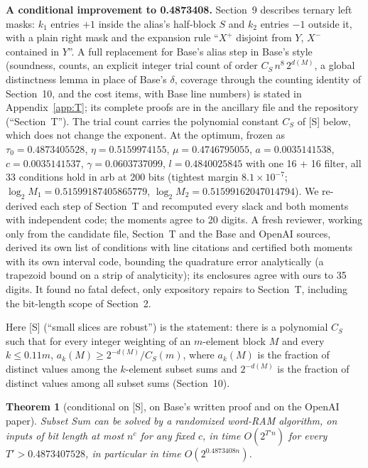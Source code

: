 \documentclass[11pt]{article}
\theoremstyle{plain}
\newtheorem{theorem}{Theorem}
\begin{document}
\textbf{A conditional improvement to 0.4873408.} Section~9 describes ternary left masks: $k_1$ entries $+1$ inside the alias's half-block $S$ and $k_2$ entries $-1$ outside it, with a plain right mask and the expansion rule ``$X^+$ disjoint from $Y$, $X^-$ contained in $Y$''. A full replacement for Base's alias step in Base's style (soundness, counts, an explicit integer trial count of order $C_S\, n^8\, 2^{d(M)}$, a global distinctness lemma in place of Base's $\delta$, coverage through the counting identity of Section~10, and the cost items, with Base line numbers) is stated in Appendix~\ref{app:T}; its complete proofs are in the ancillary file and the repository (``Section~T''). The trial count carries the polynomial constant $C_S$ of [S] below, which does not change the exponent. At the optimum, frozen as $\tau_0 = 0.4873405528$, $\eta = 0.5159974155$, $\mu = 0.4746795055$, $a = 0.0035141538$, $c = 0.0035141537$, $\gamma = 0.0603737099$, $l = 0.4840025845$ with one 16 + 16 filter, all 33 conditions hold in arb at 200 bits (tightest margin $8.1\times10^{-7}$; $\log_2 M_1 = 0.51599187405865779$, $\log_2 M_2 = 0.51599162047014794$). We re-derived each step of Section~T and recomputed every slack and both moments with independent code; the moments agree to 20 digits. A fresh reviewer, working only from the candidate file, Section~T and the Base and OpenAI sources, derived its own list of conditions with line citations and certified both moments with its own interval code, bounding the quadrature error analytically (a trapezoid bound on a strip of analyticity); its enclosures agree with ours to 35 digits. It found no fatal defect, only expository repairs to Section~T, including the bit-length scope of Section~2.

Here [S] (``small slices are robust'') is the statement: there is a polynomial $C_S$ such that for every integer weighting of an $m$-element block $M$ and every $k \le 0.11m$, $a_k(M) \ge 2^{-d(M)}/C_S(m)$, where $a_k(M)$ is the fraction of distinct values among the $k$-element subset sums and $2^{-d(M)}$ is the fraction of distinct values among all subset sums (Section~10).

\begin{theorem}[conditional on {[S]}, on Base's written proof and on the OpenAI paper]\label{thm:ternary}
Subset Sum can be solved by a randomized word-RAM algorithm, on inputs of bit length at most $n^c$ for any fixed $c$, in time $O(2^{T' n})$ for every $T' > 0.4873407528$, in particular in time $O(2^{0.4873408n})$.
\end{theorem}
\end{document}
